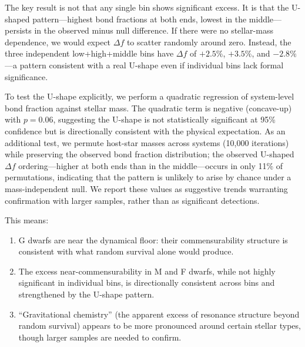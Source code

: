 \documentclass[twocolumn,usenatbib]{mnras}
\begin{document}
The key result is not that any single bin shows significant excess. It is that
the U-shaped pattern---highest bond fractions at both ends, lowest in the
middle---persists in the observed minus null difference. If there were no
stellar-mass dependence, we would expect $\Delta f$ to scatter randomly around
zero. Instead, the three independent low+high+middle bins have $\Delta f$ of
$+2.5\%$, $+3.5\%$, and $-2.8\%$---a pattern consistent with a real U-shape
even if individual bins lack formal significance.

To test the U-shape explicitly, we perform a quadratic regression of
system-level bond fraction against stellar mass. The quadratic term is
negative (concave-up) with $p = 0.06$, suggesting the U-shape is not
statistically significant at 95\% confidence but is directionally consistent
with the physical expectation. As an additional test, we permute host-star
masses across systems (10,000 iterations) while preserving the observed bond
fraction distribution; the observed U-shaped $\Delta f$ ordering---higher at
both ends than in the middle---occurs in only 11\% of permutations,
indicating that the pattern is unlikely to arise by chance under a
mass-independent null. We report these values as suggestive trends warranting
confirmation with larger samples, rather than as significant detections.

This means:
\begin{enumerate}
  \item G dwarfs are near the dynamical floor: their commensurability
        structure is consistent with what random survival alone would produce.
  \item The excess near-commensurability in M and F dwarfs, while not highly
        significant in individual bins, is directionally consistent across bins
        and strengthened by the U-shape pattern.
  \item ``Gravitational chemistry'' (the apparent excess of resonance structure
        beyond random survival) appears to be more pronounced around
        certain stellar types, though larger samples are needed to confirm.
\end{enumerate}
\end{document}
